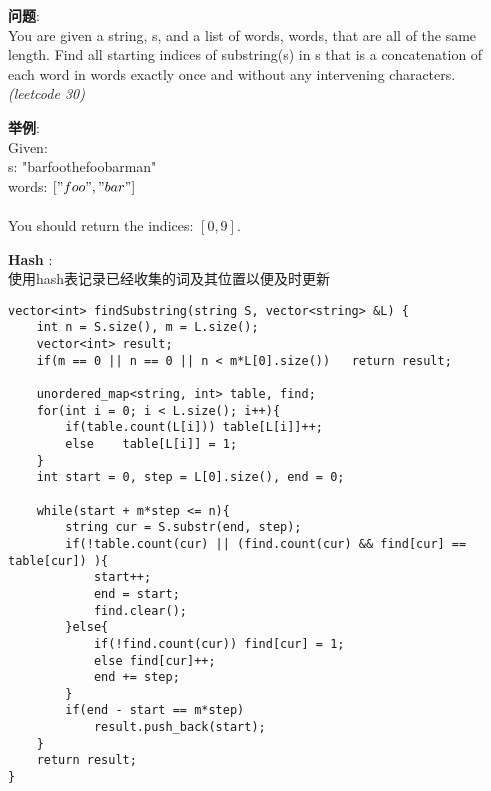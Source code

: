     
\begin{description}
    \item{\textbf{问题}}:\\
You are given a string, s, and a list of words, words, that are all of the same length. Find all starting indices of substring(s) in s that is a concatenation of each word in words exactly once and without any intervening characters.\\
\textit{(leetcode 30)}
    \item{\textbf{举例}}:\\
Given:\\
s: "barfoothefoobarman"\\
words: $["foo", "bar"]$ \\
\\
You should return the indices: $[0,9]$. \\
    \item{\textbf{Hash}} : 
    \\使用hash表记录已经收集的词及其位置以便及时更新
    \begin{lstlisting}
vector<int> findSubstring(string S, vector<string> &L) {
	int n = S.size(), m = L.size();
	vector<int> result;
	if(m == 0 || n == 0 || n < m*L[0].size())	return result;

	unordered_map<string, int> table, find;
	for(int i = 0; i < L.size(); i++){
		if(table.count(L[i])) table[L[i]]++;
		else	table[L[i]] = 1;
	}
	int start = 0, step = L[0].size(), end = 0;

	while(start + m*step <= n){
		string cur = S.substr(end, step);
		if(!table.count(cur) || (find.count(cur) && find[cur] == table[cur]) ){
			start++;
			end = start;
			find.clear();
		}else{
			if(!find.count(cur)) find[cur] = 1;
			else find[cur]++;
			end += step;		
		}
		if(end - start == m*step)
			result.push_back(start);
	}
	return result;
}
    \end{lstlisting}
\end{description}
